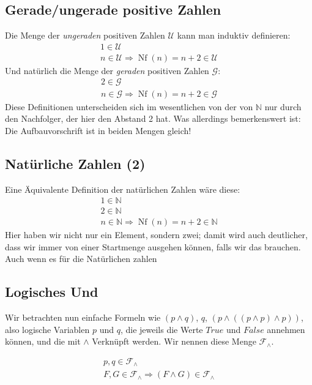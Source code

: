 \documentclass{article}
\begin{document}
\subsection{Gerade/ungerade positive Zahlen}
Die Menge der \emph{ungeraden} positiven Zahlen $\mathcal{U}$ kann man induktiv definieren:
\begin{gather}
  1 \in \mathcal{U}\\
  n \in \mathcal{U} \Rightarrow \operatorname{Nf}(n) = n + 2 \in \mathcal{U}
\end{gather}
Und natürlich die Menge der \emph{geraden} positiven Zahlen $\mathcal{G}$:
\begin{gather}
  2 \in \mathcal{G}\\
  n \in \mathcal{G} \Rightarrow \operatorname{Nf}(n) = n + 2 \in \mathcal{G}
\end{gather}
Diese Definitionen unterscheiden sich im wesentlichen von der von $\mathbb{N}$ nur durch den Nachfolger, der hier den Abstand 2 hat. Was allerdings bemerkenswert ist: Die Aufbauvorschrift ist in beiden Mengen gleich!



\subsection{Natürliche Zahlen (2)}
Eine Äquivalente Definition der natürlichen Zahlen wäre diese:
\begin{gather}
  1 \in \mathbb{N}\\
  2 \in \mathbb{N}\\
  n \in \mathbb{N} \Rightarrow \operatorname{Nf}(n) = n + 2 \in \mathbb{N}
\end{gather}
Hier haben wir nicht nur ein Element, sondern zwei; damit wird auch deutlicher, dass wir immer von einer Startmenge ausgehen können, falls wir das brauchen. Auch wenn es für die Natürlichen zahlen



\subsection{Logisches Und}
Wir betrachten nun einfache Formeln wie $(p \land q)$, $q$, $(p \land ((p \land p) \land p))$, also logische Variablen $p$ und $q$, die jeweils die Werte $True$ und $False$ annehmen können, und die mit $\land$ Verknüpft werden. Wir nennen diese Menge $\mathcal{F}_\land$.

\begin{gather}
  p, q \in \mathcal{F}_\land\\
  F, G \in \mathcal{F}_\land \Rightarrow (F \land G) \in \mathcal{F}_\land
\end{gather}
\end{document}
